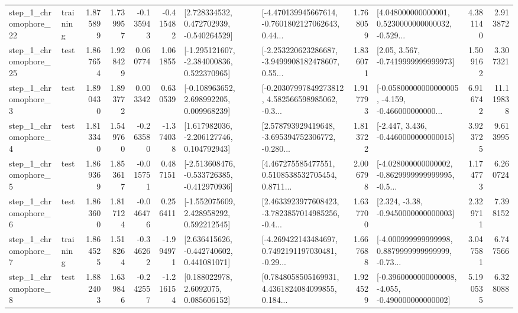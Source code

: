 \begin{tabular}{llrrrrllrlrr}
    step\_1\_chromophore\_22 &  training &      1.875899 &    1.739957 &     -0.135943 & -0.415482 &    [2.728334532, 0.472702939, -0.540264529] &  [-4.470139945667614, -0.7601802127062643, 0.44... &       1.768059 &  [4.048000000000001, 0.5230000000000032, -0.529... &            4.381140 &          2.913872 \\
    step\_1\_chromophore\_25 &      test &      1.867654 &    1.928429 &      0.060774 &  1.061855 &   [-1.295121607, -2.384000836, 0.522370965] &  [-2.253220623286687, -3.9499908182478607, 0.55... &       1.836071 &                 [2.05, 3.567, -0.7419999999999973] &            1.509162 &          3.307321 \\
     step\_1\_chromophore\_3 &      test &      1.890430 &    1.893772 &      0.003342 &  0.630539 &    [-0.108963652, 2.698992205, 0.009968239] &  [-0.20307997849273812, 4.582566598985062, -0.3... &       1.917793 &  [-0.05800000000000005, -4.159, -0.466000000000... &            6.916742 &         11.119838 \\
     step\_1\_chromophore\_4 &      test &      1.813340 &    1.549760 &     -0.263580 & -1.374038 &    [1.617982036, -2.206127746, 0.104792943] &  [2.578793929419648, -3.695394752306772, -0.280... &       1.813722 &               [-2.447, 3.436, -0.4460000000000015] &            3.923725 &          9.613995 \\
     step\_1\_chromophore\_5 &      test &      1.869369 &    1.853617 &     -0.015751 &  0.487151 &  [-2.513608476, -0.533726385, -0.412970936] &  [4.467275585477551, 0.5108538532705454, 0.8711... &       2.006798 &  [-4.028000000000002, -0.8629999999999995, -0.5... &            1.174773 &          6.260724 \\
     step\_1\_chromophore\_6 &      test &      1.863600 &    1.817124 &     -0.046476 &  0.256411 &    [-1.552075609, 2.428958292, 0.592212545] &  [2.4633923977608423, -3.7823857014985256, -0.4... &       1.637700 &                [2.324, -3.38, -0.9450000000000003] &            2.329711 &          7.398152 \\
     step\_1\_chromophore\_7 &  training &      1.864525 &    1.518264 &     -0.346262 & -1.994971 &    [2.636415626, -0.442740602, 0.441081071] &  [-4.269422143484697, 0.7492191197030481, -0.29... &       1.667688 &  [-4.000999999999998, 0.8879999999999999, -0.73... &            3.047581 &          6.747566 \\
     step\_1\_chromophore\_8 &      test &      1.882403 &    1.639846 &     -0.242557 & -1.216154 &       [0.188022978, 2.6092075, 0.085606152] &  [0.7848058505169931, 4.4361824084099855, 0.184... &       1.924529 &  [-0.3960000000000008, -4.055, -0.490000000000002] &            5.190535 &          6.328088 \\

\end{tabular}
